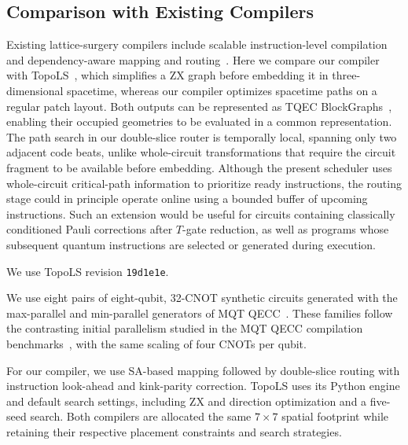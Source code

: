 \documentclass[aps, prx, 10pt, superscriptaddress, longbibliography, twocolumn]{revtex4-2}
\begin{document}
\subsection{Comparison with Existing Compilers}
\label{sec:topols_comparison}

Existing lattice-surgery compilers include scalable instruction-level compilation~\citep{watkinsHighPerformanceCompiler2024} and dependency-aware mapping and routing~\citep{molaviDependencyAwareCompilationSurface2025}.
Here we compare our compiler with TopoLS~\citep{zhouTopoLSLatticeSurgery2026}, which simplifies a ZX graph before embedding it in three-dimensional spacetime, whereas our compiler optimizes spacetime paths on a regular patch layout.
Both outputs can be represented as TQEC BlockGraphs~\citep{suauTqecPythonPackage2026}, enabling their occupied geometries to be evaluated in a common representation.
The path search in our double-slice router is temporally local, spanning only two adjacent code beats, unlike whole-circuit transformations that require the circuit fragment to be available before embedding.
Although the present scheduler uses whole-circuit critical-path information to prioritize ready instructions, the routing stage could in principle operate online using a bounded buffer of upcoming instructions.
Such an extension would be useful for circuits containing classically conditioned Pauli corrections after $T$-gate reduction, as well as programs whose subsequent quantum instructions are selected or generated during execution.

We use TopoLS revision \texttt{19d1e1e}.

We use eight pairs of eight-qubit, 32-CNOT synthetic circuits generated with the max-parallel and min-parallel generators of MQT QECC~\citep{willeMQTHandbookSummary2024}.
These families follow the contrasting initial parallelism studied in the MQT QECC compilation benchmarks~\citep[Section~VII.B]{herzogLatticeSurgeryCompilation2025}, with the same scaling of four CNOTs per qubit.

For our compiler, we use SA-based mapping followed by double-slice routing with instruction look-ahead and kink-parity correction.
TopoLS uses its Python engine and default search settings, including ZX and direction optimization and a five-seed search.
Both compilers are allocated the same $7 \times 7$ spatial footprint while retaining their respective placement constraints and search strategies.
\end{document}
